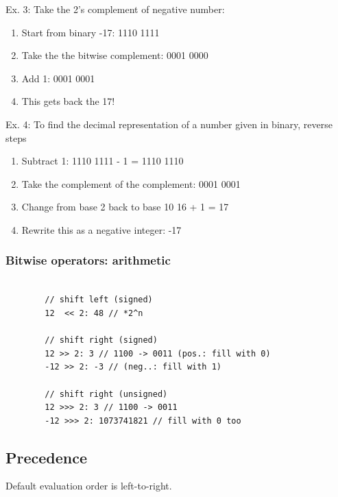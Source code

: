 \documentclass{scrartcl}
\begin{document}
    Ex. 3: Take the 2's complement of negative number:
    \begin{enumerate}
        \item Start from binary -17: 1110 1111
        \item     Take the the bitwise complement: 0001 0000
        \item     Add 1: 0001 0001
        \item     This gets back the 17!
    \end{enumerate}

    Ex. 4: To find the decimal representation of a number given in binary, reverse steps
   \begin{enumerate}
       \item  Subtract 1: 1110 1111 - 1 = 1110 1110
       \item     Take the complement of the complement: 0001 0001
       \item     Change from base 2 back to base 10 16 + 1 = 17
       \item     Rewrite this as a negative integer: -17
   \end{enumerate}

\subsubsection{Bitwise operators: arithmetic}
    \begin{lstlisting}

        // shift left (signed)
        12  << 2: 48 // *2^n

        // shift right (signed)
        12 >> 2: 3 // 1100 -> 0011 (pos.: fill with 0)
        -12 >> 2: -3 // (neg..: fill with 1)

        // shift right (unsigned)
        12 >>> 2: 3 // 1100 -> 0011
        -12 >>> 2: 1073741821 // fill with 0 too
    \end{lstlisting}

\subsection{Precedence}

    Default evaluation order is left-to-right.
\end{document}
